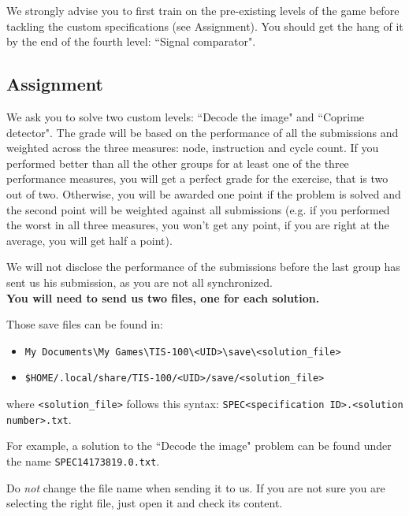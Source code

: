 \documentclass[10pt,a4paper]{article}
\theoremstyle{definition}%
\newtheorem{Q}{Question}[] %
\begin{document}
We strongly advise you to first train on the pre-existing levels of the game before tackling the custom specifications (see Assignment).
You should get the hang of it by the end of the fourth level: ``Signal comparator".

\subsection{Assignment}
We ask you to solve two custom levels: ``Decode the image" and ``Coprime detector".
The grade will be based on the performance of all the submissions and weighted across the three measures: node, instruction and cycle count.
If you performed better than all the other groups for at least one of the three performance measures, you will get a perfect grade for the exercise, that is two out of two.
Otherwise, you will be awarded one point if the problem is solved and the second point will be weighted against all submissions (e.g. if you performed the worst in all three measures, you won't get any point, if you are right at the average, you will get half a point).

We will not disclose the performance of the submissions before the last group has sent us his submission, as you are not all synchronized.
~\\

\textbf{You will need to send us two  files, one for each solution.}

Those save files can be found in:
\begin{itemize}
	\item[\faWindows] \verb|My Documents\My Games\TIS-100\<UID>\save\<solution_file>|
	\item[\faLinux] \verb|$HOME/.local/share/TIS-100/<UID>/save/<solution_file>|
\end{itemize}
where \texttt{<solution\_file>} follows this syntax: \texttt{SPEC<specification ID>.<solution number>.txt}.

For example, a solution to the ``Decode the image" problem can be found under the name \texttt{SPEC14173819.0.txt}.

Do \textit{not} change the file name when sending it to us.
If you are not sure you are selecting the right file, just open it and check its content.

\end{document}
